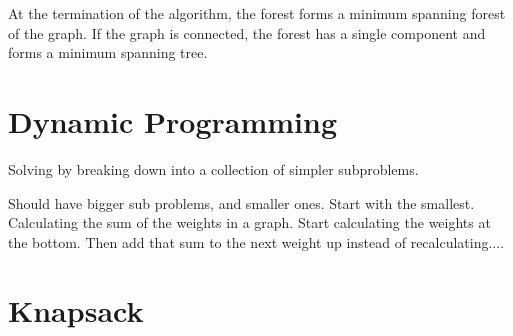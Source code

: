 \documentclass[10 pt]{article}
\begin{document}
At the termination of the algorithm, the forest forms a minimum spanning forest of the graph. If the graph is connected, the forest has a single component and forms a minimum spanning tree.


\section{Dynamic Programming}
Solving by breaking down into a collection of simpler subproblems.

Should have bigger sub problems, and smaller ones.
Start with the smallest. Calculating the sum of the weights in a graph. Start calculating the weights at the bottom. Then add that sum to the next weight up instead of recalculating....

\section{Knapsack}
\end{document}
